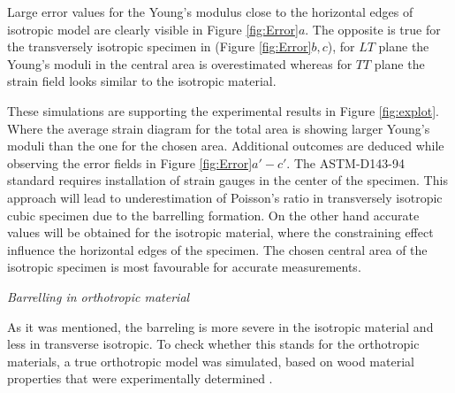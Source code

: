 \documentclass[review]{elsarticle}
\begin{document}
Large error values for the Young's
modulus close to the horizontal edges of isotropic model are clearly visible in
Figure \ref{fig:Error}$a$. The opposite is true for the transversely isotropic
specimen in (Figure \ref{fig:Error}$b,c$), for $LT$ plane 
the Young's moduli in the central area is overestimated whereas for $TT$ plane
the strain field looks similar to the isotropic material.\par
These simulations are supporting the experimental results in Figure
\ref{fig:explot}. Where the average strain diagram for the total area is showing larger Young's moduli than
the one for the chosen area.
Additional outcomes are deduced  while observing the error fields in Figure
\ref{fig:Error}$a'-c'$. The ASTM-D143-94 standard \cite{american2009standard} requires
installation of strain gauges in the center of the specimen. This approach will
lead to underestimation of Poisson's ratio in transversely isotropic cubic
specimen due to the barrelling formation. On the other hand accurate values will
be obtained for the isotropic material, where the constraining effect influence
the horizontal edges of the specimen. The chosen central area of the isotropic
specimen is most favourable for accurate measurements.


\begin{description}
\item{\textit{Barrelling in orthotropic material}}
\end{description}
As it was mentioned, the barreling is more severe in the isotropic material and
less in transverse isotropic. To check whether this stands for the orthotropic
materials, a true orthotropic model was simulated, based on wood material properties
that were experimentally determined \cite{vorobyevcharacterisation}. \par
\end{document}
